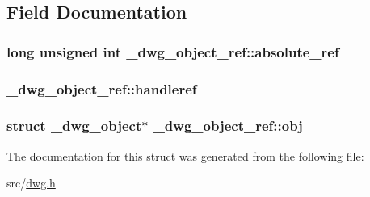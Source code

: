 \subsection{\-Field \-Documentation}
\hypertarget{struct__dwg__object__ref_a165ed48b878bbed103aa19b9524b12a2}{
\subsubsection[{absolute\-\_\-ref}]{\setlength{\rightskip}{0pt plus 5cm}long unsigned int {\bf \-\_\-dwg\-\_\-object\-\_\-ref\-::absolute\-\_\-ref}}}\label{struct__dwg__object__ref_a165ed48b878bbed103aa19b9524b12a2}
\hypertarget{struct__dwg__object__ref_ae54a2bb37c877a32a0b942ae48525ae8}{
\subsubsection[{handleref}]{ {\bf \-\_\-dwg\-\_\-object\-\_\-ref\-::handleref}}}\label{struct__dwg__object__ref_ae54a2bb37c877a32a0b942ae48525ae8}
\hypertarget{struct__dwg__object__ref_a21349f90b54fb8ada1cf857a88c0f784}{
\subsubsection[{obj}]{\setlength{\rightskip}{0pt plus 5cm}struct {\bf \-\_\-dwg\-\_\-object}$\ast$ {\bf \-\_\-dwg\-\_\-object\-\_\-ref\-::obj}}}\label{struct__dwg__object__ref_a21349f90b54fb8ada1cf857a88c0f784}


\-The documentation for this struct was generated from the following file\-:\begin{DoxyCompactItemize}
\item 
src/\hyperlink{dwg_8h}{dwg.\-h}\end{DoxyCompactItemize}

